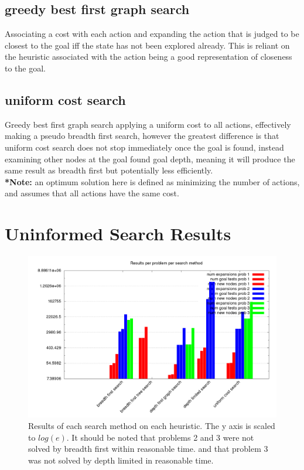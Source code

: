 \documentclass[11pt]{article}
\begin{document}
\subsection{greedy best first graph search}
Associating a cost with each action and expanding the action that is judged to be closest to the goal iff the state has not been explored already. This is reliant on the heuristic associated with the action being a good representation of closeness to the goal.

\subsection{uniform cost search}
Greedy best first graph search applying a uniform cost to all actions, effectively making a pseudo breadth first search, however the greatest difference is that uniform cost search does not stop immediately once the goal is found, instead examining other nodes at the goal found goal depth\cite{russell2005ai}, meaning it will produce the same result as breadth first but potentially less efficiently.\\

\textbf{*Note:} an optimum solution here is defined as minimizing the number of actions, and assumes that all actions have the same cost.

\section{Uninformed Search Results}

\begin{figure}[H]
	\includegraphics[scale=0.32]{results_summary.png}
	\caption{Results of each search method on each heuristic. The y axis is scaled to $log(e)$.
			 It should be noted that problems 2 and 3 were not solved by breadth first within reasonable time. and that problem 3 was not solved by depth limited in reasonable time.}
	\label{uninformed_results_summary}
\end{figure}
\end{document}
